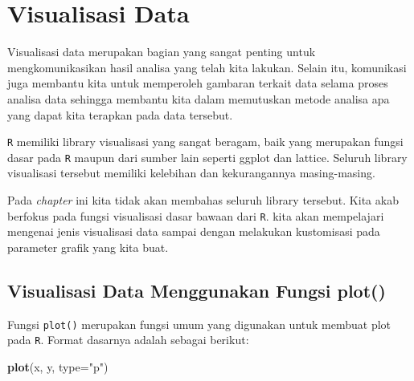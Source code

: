 \documentclass[]{book}
\newenvironment{Shaded}{\begin{snugshade}}{\end{snugshade}}
\newcommand{\DataTypeTok}[1]{\textcolor[rgb]{0.13,0.29,0.53}{#1}}
\newcommand{\KeywordTok}[1]{\textcolor[rgb]{0.13,0.29,0.53}{\textbf{#1}}}
\newcommand{\NormalTok}[1]{#1}
\newcommand{\StringTok}[1]{\textcolor[rgb]{0.31,0.60,0.02}{#1}}
\theoremstyle{definition}
\theoremstyle{definition}
\theoremstyle{definition}
\theoremstyle{remark}
\begin{document}
\hypertarget{dataviz}{%
\chapter{Visualisasi Data}\label{dataviz}}

Visualisasi data merupakan bagian yang sangat penting untuk mengkomunikasikan hasil analisa yang telah kita lakukan. Selain itu, komunikasi juga membantu kita untuk memperoleh gambaran terkait data selama proses analisa data sehingga membantu kita dalam memutuskan metode analisa apa yang dapat kita terapkan pada data tersebut.

\texttt{R} memiliki library visualisasi yang sangat beragam, baik yang merupakan fungsi dasar pada \texttt{R} maupun dari sumber lain seperti ggplot dan lattice. Seluruh library visualisasi tersebut memiliki kelebihan dan kekurangannya masing-masing.

Pada \emph{chapter} ini kita tidak akan membahas seluruh library tersebut. Kita akab berfokus pada fungsi visualisasi dasar bawaan dari \texttt{R}. kita akan mempelajari mengenai jenis visualisasi data sampai dengan melakukan kustomisasi pada parameter grafik yang kita buat.

\hypertarget{plotfunc}{%
\section{Visualisasi Data Menggunakan Fungsi plot()}\label{plotfunc}}

Fungsi \texttt{plot()} merupakan fungsi umum yang digunakan untuk membuat plot pada \texttt{R}. Format dasarnya adalah sebagai berikut:

\begin{Shaded}
\begin{Highlighting}[]
\KeywordTok{plot}\NormalTok{(x, y, }\DataTypeTok{type=}\StringTok{"p"}\NormalTok{)}
\end{Highlighting}
\end{Shaded}
\end{document}
